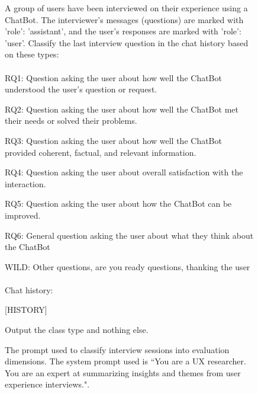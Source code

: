 \begin{figure*}[h]
    \centering
    \small
\begin{tcolorbox}[colback=gray!1, colframe=black!50, title=Dimension Classification Prompt:]

A group of users have been interviewed on their experience using a ChatBot. The interviewer's messages (questions) are marked with 'role': 'assistant', and the user's responses are marked with 'role': 'user'. Classify the last interview question in the chat history based on these types:\\
\\
    RQ1: Question asking the user about how well the ChatBot understood the user's question or request.
              
    RQ2: Question asking the user about how well the ChatBot met their needs or solved their problems.
                
    RQ3: Question asking the user about how well the ChatBot provided coherent, factual, and relevant information.
                
    RQ4: Question asking the user about overall satisfaction with the interaction.
                
    RQ5: Question asking the user about how the ChatBot can be improved.
                
    RQ6: General question asking the user about what they think about the ChatBot
                
    WILD: Other questions, are you ready questions, thanking the user\\
\\
Chat history:

[HISTORY]

Output the class type and nothing else.

\end{tcolorbox}
    \caption{The prompt used to classify interview sessions into evaluation dimensions. The system prompt used is ``You are a UX researcher. You are an expert at summarizing insights and themes from user experience interviews.".}
    \label{fig:insight_dimension_classsifier_prompt}
\end{figure*}




